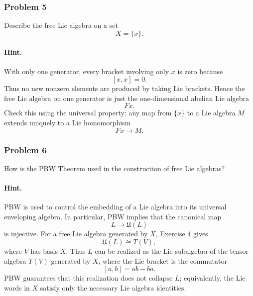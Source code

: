 \documentclass[12pt, a4paper]{article}
\begin{document}
\subsubsection{Problem 5}

Describe the free Lie algebra on a set
\[
X=\{x\}.
\]

\paragraph{Hint.}
With only one generator, every bracket involving only \(x\) is zero because
\[
[x,x]=0.
\]
Thus no new nonzero elements are produced by taking Lie brackets. Hence the
free Lie algebra on one generator is just the one-dimensional abelian Lie
algebra
\[
Fx.
\]
Check this using the universal property: any map from \(\{x\}\) to a Lie
algebra \(M\) extends uniquely to a Lie homomorphism
\[
Fx\to M.
\]

\subsubsection{Problem 6}

How is the PBW Theorem used in the construction of free Lie algebras?

\paragraph{Hint.}
PBW is used to control the embedding of a Lie algebra into its universal
enveloping algebra. In particular, PBW implies that the canonical map
\[
L\to \mathfrak U(L)
\]
is injective. For a free Lie algebra generated by \(X\), Exercise 4 gives
\[
\mathfrak U(L)\cong T(V),
\]
where \(V\) has basis \(X\). Thus \(L\) can be realized as the Lie subalgebra
of the tensor algebra \(T(V)\) generated by \(X\), where the Lie bracket is the
commutator
\[
[a,b]=ab-ba.
\]
PBW guarantees that this realization does not collapse \(L\); equivalently, the
Lie words in \(X\) satisfy only the necessary Lie algebra identities.
\end{document}
